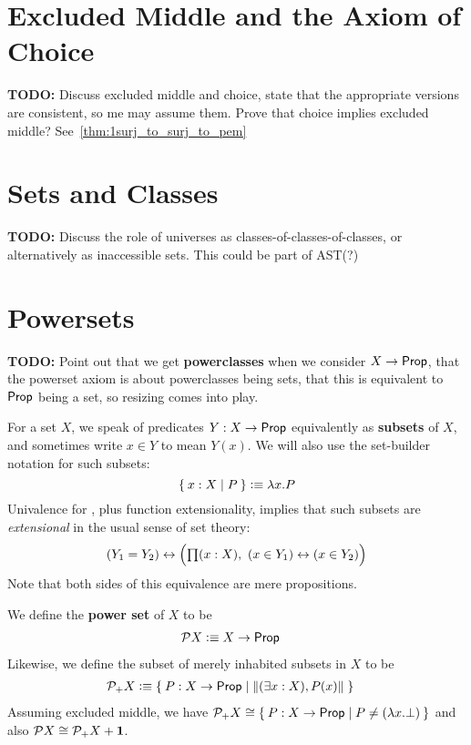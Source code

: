 \section{Excluded Middle and the Axiom of Choice}
\label{sec:excl-middle-axiom}

\textbf{TODO:} Discuss excluded middle and choice, state that the appropriate versions are
consistent, so me may assume them. Prove that choice implies excluded middle?
See~\ref{thm:1surj_to_surj_to_pem}

\section{Sets and Classes}
\label{sec:sets-classes}

\textbf{TODO:} Discuss the role of universes as classes-of-classes-of-classes, or
alternatively as inaccessible sets.
This could be part of AST(?)

\section{Powersets}
\label{sec:powersets}

\textbf{TODO:} Point out that we get \textbf{powerclasses} when we consider $X \to \mathsf{Prop}$, that the
powerset axiom is about powerclasses being sets, that this is equivalent to $\mathsf{Prop}$ being
a set, so resizing comes into play.

For a set $X$, we speak of predicates $Y:X\to \mathsf{Prop}$ equivalently as \textbf{subsets} of $X$, and sometimes write $x\in Y$ to mean $Y(x)$.
We will also use the set-builder notation for such subsets:
\[ \Set{x:X | P } \vcentcolon\equiv \lambda x.P \]
Univalence for \prop, plus function extensionality, implies that such subsets are \emph{extensional} in the usual sense of set theory:
\[ (Y_1 = Y_2) \leftrightarrow \Big(\prd{x:X} (x\in Y_1) \leftrightarrow (x\in Y_2)\Big) \]
Note that both sides of this equivalence are mere propositions.

We define the \textbf{power set} of $X$ to be
\begin{align*}
  \mathcal{P} X &\vcentcolon\equiv X\to \mathsf{Prop}
\end{align*}
Likewise, we define the subset of merely inhabited subsets in $X$ to be
\begin{align*}
  \mathcal{P}_+ X &\defeq \setof{P:X\to \prop | \brck{(\exists x:X), P(x)}}
\end{align*}
Assuming excluded middle, we have $\mathcal{P}_+ X \cong \setof{P:X\to \prop | P \neq (\lambda x.\bot)}$ and also $\mathcal{P} X \cong \mathcal{P}_+ X + \mathbf{1}$.

